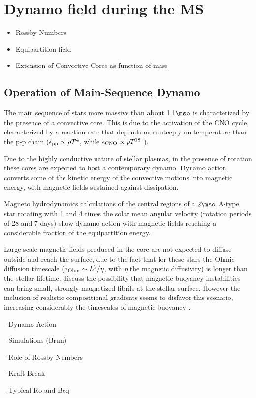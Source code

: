 
  \section{Dynamo field during the MS}
\begin{itemize}
\item Rossby Numbers
\item Equipartition field
\item Extension of Convective Cores as function of mass
\end{itemize}


\subsection{Operation of Main-Sequence Dynamo}
The main sequence of stars more massive than about 1.1$\mso$ is characterized by the presence of a convective core.
This is due to the activation of the CNO cycle, characterized by a reaction rate that depends more steeply on temperature than the p-p chain ($\epsilon_{\rm pp}\propto \rho T^{4}$, while $\epsilon_{\rm CNO}\propto \rho T^{18}$ ).

Due to the highly conductive nature of stellar plasmas, in the presence of rotation
these cores are expected to host a contemporary dynamo. Dynamo action converts some of the kinetic energy 
of the convective motions into magnetic energy, with magnetic fields sustained against dissipation.

Magneto hydrodynamics calculations of the central regions of a  $2\mso$ A-type star rotating with 
1 and 4 times the solar mean angular velocity (rotation periods of 28 and 7 days) show dynamo action 
with magnetic fields reaching a considerable fraction of the equipartition energy.


Large scale magnetic fields produced in the core are not expected to diffuse outside and reach the surface, due to the fact that for these stars the Ohmic diffusion timescale ($\tau_{\rm Ohm}\sim L^2/\eta$, with $\eta$ the magnetic diffusivity) is longer than the stellar lifetime. \citet{MacGregor_2003} discuss the possibility that magnetic buoyancy instabilities can bring small, strongly magnetized fibrils at the stellar surface. However the inclusion of realistic compositional gradients seems to disfavor this scenario, increasing considerably the timescales of magnetic buoyancy \cite{MacDonald_2004}.  



- Dynamo Action

- Simulations (Brun)

- Role of Rossby Numbers

- Kraft Break
  
- Typical Ro and Beq   
  
  